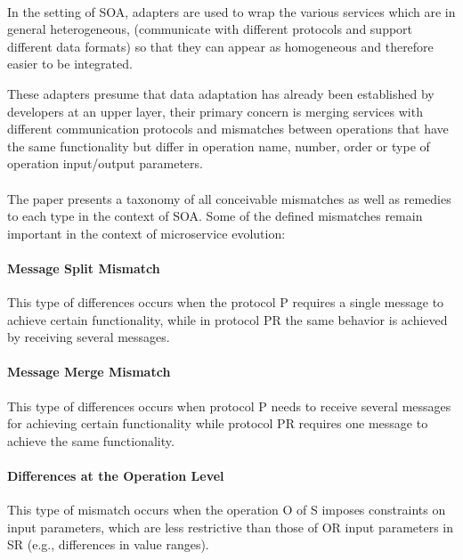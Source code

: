 \paragraph{}

In the setting of SOA, adapters are used to wrap the various services which are in general heterogeneous,
(communicate with different protocols and support different data formats) so that they can appear as homogeneous and therefore easier to be integrated.

These adapters presume that data adaptation has already been established by developers at an upper layer,
their primary concern is merging services with different communication protocols and mismatches between operations that have the
same functionality but differ in operation name, number, order or type of operation input/output parameters.

\paragraph{}

The paper \cite{15} presents a taxonomy of all conceivable mismatches as well as remedies to each type in the context of SOA.
Some of the defined mismatches remain important in the context of microservice evolution:

\paragraph{Message Split Mismatch}
This type of differences occurs when the protocol P requires a single message to achieve certain functionality,
while in protocol PR the same behavior is achieved by receiving several messages.

\paragraph{Message Merge Mismatch}
This type of differences occurs when protocol P needs to receive several messages for achieving certain
functionality while protocol PR requires one message to achieve the same functionality.

\paragraph{Differences at the Operation Level}
This type of mismatch occurs when the operation O of S imposes constraints on input parameters,
which are less restrictive than those of OR input parameters in SR (e.g., differences in value ranges).

